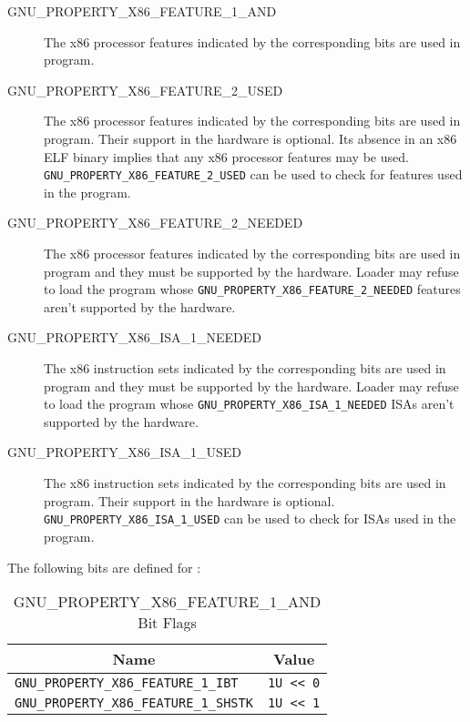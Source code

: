 \begin{description}
 \item[GNU_PROPERTY_X86_FEATURE_1_AND] The x86 processor features
   indicated by the corresponding bits are used in program.
 \item[GNU_PROPERTY_X86_FEATURE_2_USED] The x86 processor features
   indicated by the corresponding bits are used in program.  Their
   support in the hardware is optional.  Its absence in an x86 ELF
   binary implies that any x86 processor features may be used.
   \texttt{GNU_PROPERTY_X86_FEATURE_2_USED} can be used to check for
   features used in the program.
 \item[GNU_PROPERTY_X86_FEATURE_2_NEEDED] The x86 processor features
   indicated by the corresponding bits are used in program and they
   must be supported by the hardware.  Loader may refuse to load
   the program whose \texttt{GNU_PROPERTY_X86_FEATURE_2_NEEDED}
   features aren't supported by the hardware.
 \item[GNU_PROPERTY_X86_ISA_1_NEEDED] The x86 instruction sets indicated
   by the corresponding bits are used in program and they must be
   supported by the hardware.  Loader may refuse to load the program
   whose \texttt{GNU_PROPERTY_X86_ISA_1_NEEDED} ISAs aren't supported
   by the hardware.
 \item[GNU_PROPERTY_X86_ISA_1_USED] The x86 instruction sets indicated
   by the corresponding bits are used in program.  Their support in the
   hardware is optional.  \texttt{GNU_PROPERTY_X86_ISA_1_USED} can be
   used to check for ISAs used in the program.
\end{description}

The following bits are defined for :

\begin{table}[H]
\Hrule
  \caption{GNU_PROPERTY_X86_FEATURE_1_AND Bit Flags}
  \begin{center}
    \begin{tabular}[t]{l|l}
      \multicolumn{1}{c}{Name} & \multicolumn{1}{c}{Value} \\
      \hline
     \texttt{GNU_PROPERTY_X86_FEATURE_1_IBT} & \texttt{1U << 0} \\
     \texttt{GNU_PROPERTY_X86_FEATURE_1_SHSTK} & \texttt{1U << 1} \\
    \end{tabular}
  \end{center}
\Hrule
\end{table}

